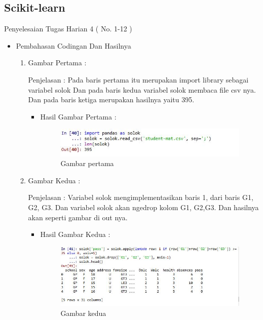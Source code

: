 \subsection{Scikit-learn}
Penyelesaian Tugas Harian 4 ( No. 1-12 )
\begin{itemize}
\item Pembahasan Codingan Dan Hasilnya
\begin{enumerate}
\item Gambar Pertama :
\par Penjelasan : Pada baris pertama itu merupakan import library sebagai variabel solok                                                                                                                           Dan pada baris kedua variabel solok membaca file csv nya. Dan pada baris ketiga merupakan hasilnya yaitu 395.

\par
\begin{itemize}
\par
\item Hasil  Gambar Pertama :
\par

\begin{figure}[ht]
\centering
\includegraphics[scale=0.6]{figures/1.jpg}
\caption{ Gambar pertama}
\label{1}
\end{figure}

\par
\end{itemize}
\item  Gambar Kedua :
\par Penjelasan : Variabel solok mengimplementasikan baris 1, dari baris G1, G2, G3. Dan variabel solok akan ngedrop kolom G1, G2,G3. Dan hasilnya akan seperti gambar di out nya.
\par 
\begin{itemize}
\par
\item Hasil Gambar Kedua :

\begin{figure}[ht]
\centering
\includegraphics[scale=0.7]{figures/2.jpg}
\caption{Gambar kedua}
\label{2}
\end{figure}


\end{itemize}
\end{enumerate}
\end{itemize}
